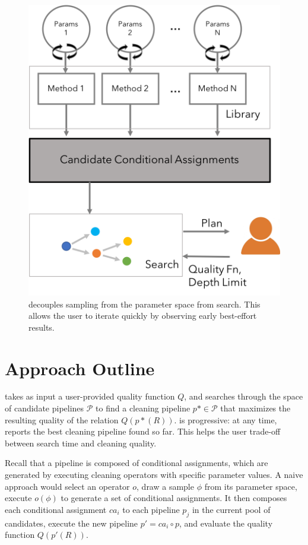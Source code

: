 \begin{figure}[t]
\centering
 \includegraphics[width=0.7\columnwidth]{figures/architecture.png}
 \caption{\small \sys decouples sampling from the parameter space from search. This allows the user to iterate quickly by observing early best-effort results. \label{fig:arch}}
\end{figure}



\section{Approach Outline}

\sys takes as input a user-provided quality function $Q$, and searches through the space of candidate pipelines $\mathcal{P}$ to find a cleaning pipeline $p*\in\mathcal{P}$ that maximizes the resulting quality of the relation $Q(p*(R))$.  \sys is progressive: at any time, \sys reports the best cleaning pipeline found so far.  This helps the user trade-off between search time and cleaning quality.

Recall that a pipeline is composed of conditional assignments, which are generated by executing cleaning operators with specific parameter values.   A naive approach would select an operator $o$, draw a sample $\phi$ from its parameter space, execute $o(\phi)$ to generate a set of conditional assignments.  It then composes each conditional assignment $ca_i$ to each pipeline $p_j$ in the current pool of candidates, execute the new pipeline $p' = ca_i \circ p$, and evaluate the quality function $Q(p'(R))$.

